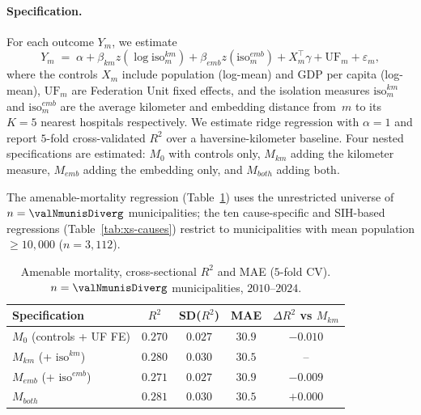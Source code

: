 \paragraph{Specification.} For each outcome $Y_m$, we estimate
\begin{equation}
  Y_m \;=\; \alpha + \beta_{km} z(\log \mathrm{iso}^{km}_m) +
            \beta_{emb} z(\mathrm{iso}^{emb}_m) +
            X_m^\top \gamma + \mathrm{UF}_m + \varepsilon_m,
  \label{eq:xs}
\end{equation}
where the controls $X_m$ include population (log-mean) and GDP per
capita (log-mean), $\mathrm{UF}_m$ are Federation Unit fixed effects,
and the isolation measures $\mathrm{iso}^{km}_m$ and
$\mathrm{iso}^{emb}_m$ are the average kilometer and embedding distance
from~$m$ to its $K=5$ nearest hospitals respectively. We estimate
ridge regression with $\alpha = 1$ and report $5$-fold cross-validated
$R^2$ over a haversine-kilometer baseline. Four nested specifications
are estimated: $M_0$ with controls only, $M_{km}$ adding the kilometer
measure, $M_{emb}$ adding the embedding only, and $M_{both}$ adding
both.

The amenable-mortality regression (Table~\ref{tab:xs-amenable}) uses
the unrestricted universe of $n = \valNmunisDiverg$ municipalities; the
ten cause-specific and SIH-based regressions (Table~\ref{tab:xs-causes})
restrict to municipalities with mean population $\geq 10{,}000$
($n = 3{,}112$).

\begin{table}[h!]
\centering
\caption{Amenable mortality, cross-sectional $R^2$ and MAE
($5$-fold CV). $n = \valNmunisDiverg$ municipalities, $2010$--$2024$.}
\label{tab:xs-amenable}
\small
\begin{tabular}{lcccc}
\toprule
Specification & $R^2$ & SD($R^2$) & MAE & $\Delta R^2$ vs $M_{km}$ \\
\midrule
$M_0$ (controls + UF FE)         & $0.270$ & $0.027$ & $30.9$ & $-0.010$ \\
$M_{km}$ (+ $\mathrm{iso}^{km}$) & $0.280$ & $0.030$ & $30.5$ & --      \\
$M_{emb}$ (+ $\mathrm{iso}^{emb}$) & $0.271$ & $0.027$ & $30.9$ & $-0.009$ \\
$M_{both}$                       & $0.281$ & $0.030$ & $30.5$ & $+0.000$ \\
\bottomrule
\end{tabular}
\end{table}


